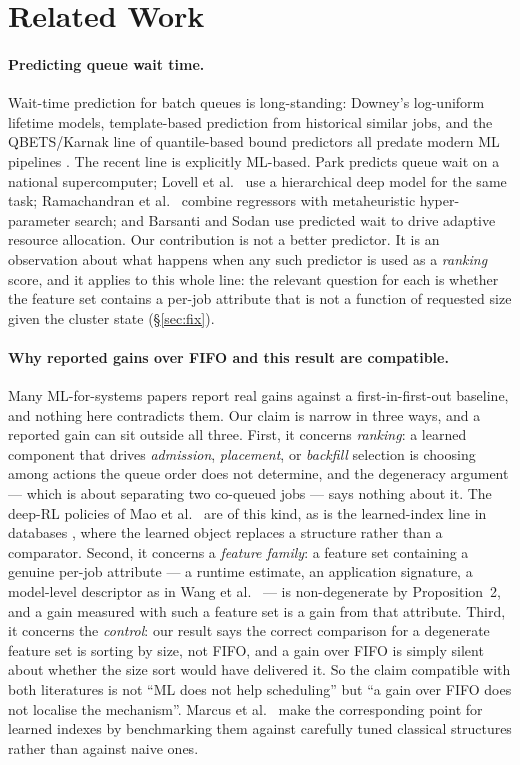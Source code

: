 \documentclass[11pt,twocolumn]{article}
\begin{document}
\section{Related Work}

\paragraph{Predicting queue wait time.}
Wait-time prediction for batch queues is long-standing: Downey's log-uniform
lifetime models, template-based prediction from historical similar jobs, and the
QBETS/Karnak line of quantile-based bound predictors all predate modern ML
pipelines \cite{Feitelson1997, Feitelson2011}. The recent line is explicitly
ML-based. Park \cite{Park2019} predicts queue wait on a national
supercomputer; Lovell et al.\ \cite{Lovell2024} use a hierarchical deep model
for the same task; Ramachandran et al.\ \cite{Ramachandran2024} combine
regressors with metaheuristic hyper-parameter search; and Barsanti and Sodan
\cite{Barsanti2006} use predicted wait to drive adaptive resource allocation.
Our contribution is not a better predictor. It is an observation about what
happens when any such predictor is used as a \emph{ranking} score, and it
applies to this whole line: the relevant question for each is whether the
feature set contains a per-job attribute that is not a function of requested
size given the cluster state (\S\ref{sec:fix}).

\paragraph{Why reported gains over FIFO and this result are compatible.}
Many ML-for-systems papers report real gains against a first-in-first-out
baseline, and nothing here contradicts them. Our claim is narrow in three ways,
and a reported gain can sit outside all three. First, it concerns
\emph{ranking}: a learned component that drives \emph{admission}, \emph{placement},
or \emph{backfill} selection is choosing among actions the queue order does not
determine, and the degeneracy argument --- which is about separating two
co-queued jobs --- says nothing about it. The deep-RL policies of Mao et al.\
\cite{ML-Scheduling1, ML-Scheduling2} are of this kind, as is the learned-index
line in databases \cite{Kraska2018}, where the learned object replaces a
structure rather than a comparator. Second, it concerns a \emph{feature family}:
a feature set containing a genuine per-job attribute --- a runtime estimate, an
application signature, a model-level descriptor as in Wang et al.\
\cite{Wang2023} --- is non-degenerate by Proposition~2, and a gain measured with
such a feature set is a gain from that attribute. Third, it concerns the
\emph{control}: our result says the correct comparison for a degenerate feature
set is sorting by size, not FIFO, and a gain over FIFO is simply silent about
whether the size sort would have delivered it. So the claim compatible with both
literatures is not ``ML does not help scheduling'' but ``a gain over FIFO does
not localise the mechanism''. Marcus et al.\ \cite{Marcus2020} make the
corresponding point for learned indexes by benchmarking them against carefully
tuned classical structures rather than against naive ones.
\end{document}
